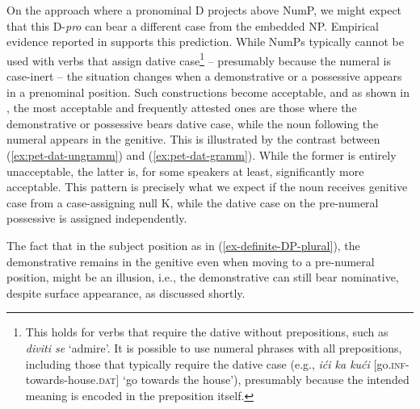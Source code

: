 \documentclass[output=paper,colorlinks,citecolor=brown
]{langscibook}
\begin{document}
\noindent On the approach where a pronominal D projects above NumP, we might expect that this D-\textit{pro} can bear a different case from the embedded NP. Empirical evidence reported in \citet{Milosavljevic2013} supports this prediction. While NumPs typically cannot be used with verbs that assign dative case\footnote{This holds for verbs that require the dative without prepositions, such as \textit{diviti se} `admire'. It is possible to use numeral phrases with all prepositions, including those that typically require the dative case (e.g., \textit{ići ka kući} [go.\textsc{inf}-towards-house.\textsc{dat}] `go towards the house'), presumably because the intended meaning is encoded in the preposition itself.} -- presumably because the numeral is case-inert -- the situation changes when a demonstrative or a possessive appears in a prenominal position. Such constructions become acceptable, and as shown in \citet{Milosavljevic2013}, the most acceptable and frequently attested ones are those where the demonstrative or possessive bears dative case, while the noun following the numeral appears in the genitive. 
This is illustrated by the contrast between (\ref{ex:pet-dat-ungramm}) and (\ref{ex:pet-dat-gramm}). While the former is entirely unacceptable, the latter is, for some speakers at least, significantly more acceptable. This pattern is precisely what we expect if the noun receives genitive case from a case-assigning null K, while the dative case on the pre-numeral possessive is assigned independently.


\z  


\z  

\noindent The fact that in the subject position as in (\ref{ex-definite-DP-plural}), the demonstrative remains in the genitive even when moving to a pre-numeral position, might be an illusion, i.e., the demonstrative can still bear nominative, despite surface appearance, as discussed shortly.  
\end{document}
